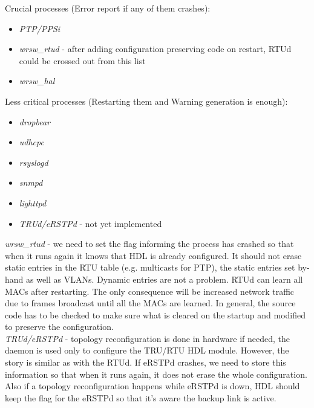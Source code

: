 \begin{packed_enum}
				Crucial processes (Error report if any of them crashes):
				\begin{itemize}
					\item \emph{PTP/PPSi}
					\item \emph{wrsw\_rtud} - after adding configuration preserving code
						on restart, RTUd could be crossed out from this list
					\item \emph{wrsw\_hal}
				\end{itemize}
				Less critical processes (Restarting them and Warning generation is
				enough):
				\begin{itemize}
					\item \emph{dropbear}
					\item \emph{udhcpc}
					\item \emph{rsyslogd}
					\item \emph{snmpd}
					\item \emph{lighttpd}
					\item \emph{TRUd/eRSTPd} - not yet implemented
				\end{itemize}

				\emph{wrsw\_rtud} - we need to set the flag informing the process has
				crashed so that when it runs again it knows that HDL is already
				configured. It should not erase static entries in the RTU table (e.g.
				multicasts for PTP), the static entries set by-hand as well as VLANs.
				Dynamic entries are not a problem. RTUd can learn all MACs after
				restarting. The only consequence will be increased network traffic due
				to frames broadcast until all the MACs are learned. In general,
				the source code has to be checked to make sure what is cleared on the
				startup and modified to preserve the configuration.\\

				\emph{TRUd/eRSTPd} - topology reconfiguration is done in hardware if
				needed, the daemon is used only to configure the TRU/RTU HDL module.
				However, the story is similar as with the RTUd. If eRSTPd crashes, we
				need to store this information so that when it runs again, it does not
				erase the whole configuration. Also if a topology reconfiguration
				happens while eRSTPd is down, HDL should keep the flag for the eRSTPd so
				that it's aware the backup link is active.
		\end{packed_enum}

